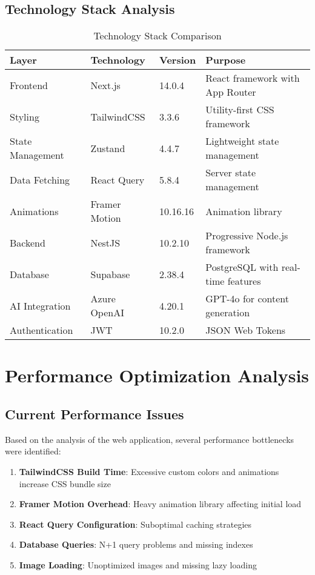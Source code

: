 \documentclass[12pt,a4paper]{article}
\begin{document}
\subsection{Technology Stack Analysis}

\begin{table}[H]
\centering
\caption{Technology Stack Comparison}
\begin{tabular}{|l|l|l|l|}
\hline
\textbf{Layer} & \textbf{Technology} & \textbf{Version} & \textbf{Purpose} \\
\hline
Frontend & Next.js & 14.0.4 & React framework with App Router \\
\hline
Styling & TailwindCSS & 3.3.6 & Utility-first CSS framework \\
\hline
State Management & Zustand & 4.4.7 & Lightweight state management \\
\hline
Data Fetching & React Query & 5.8.4 & Server state management \\
\hline
Animations & Framer Motion & 10.16.16 & Animation library \\
\hline
Backend & NestJS & 10.2.10 & Progressive Node.js framework \\
\hline
Database & Supabase & 2.38.4 & PostgreSQL with real-time features \\
\hline
AI Integration & Azure OpenAI & 4.20.1 & GPT-4o for content generation \\
\hline
Authentication & JWT & 10.2.0 & JSON Web Tokens \\
\hline
\end{tabular}
\label{tab:tech-stack}
\end{table}

\section{Performance Optimization Analysis}

\subsection{Current Performance Issues}

Based on the analysis of the web application, several performance bottlenecks were identified:

\begin{enumerate}
    \item \textbf{TailwindCSS Build Time}: Excessive custom colors and animations increase CSS bundle size
    \item \textbf{Framer Motion Overhead}: Heavy animation library affecting initial load
    \item \textbf{React Query Configuration}: Suboptimal caching strategies
    \item \textbf{Database Queries}: N+1 query problems and missing indexes
    \item \textbf{Image Loading}: Unoptimized images and missing lazy loading
\end{enumerate}
\end{document}
